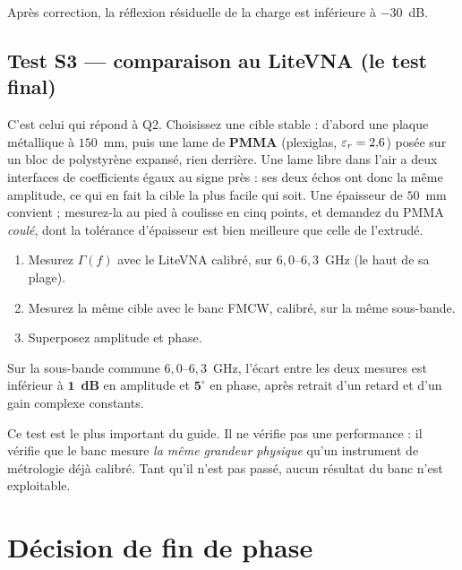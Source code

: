 \begin{critere}
Après correction, la réflexion résiduelle de la charge est inférieure à
$-30$~dB.
\end{critere}

\subsection{Test S3 --- comparaison au LiteVNA (le test final)}

C'est celui qui répond à Q2. Choisissez une cible stable : d'abord une plaque
métallique à $150$~mm, puis une lame de \textbf{PMMA} (plexiglas,
$\varepsilon_r = 2{,}6$) posée sur un bloc de polystyrène expansé, rien derrière. Une
lame libre dans l'air a deux interfaces de coefficients égaux au signe près :
ses deux échos ont donc la même amplitude, ce qui en fait la cible la plus
facile qui soit. Une épaisseur de $50$~mm convient ; mesurez-la au pied à
coulisse en cinq points, et demandez du PMMA \emph{coulé}, dont la tolérance
d'épaisseur est bien meilleure que celle de l'extrudé.

\begin{enumerate}[nosep]
\item Mesurez $\Gamma(f)$ avec le LiteVNA calibré, sur $6{,}0$--$6{,}3$~GHz
      (le haut de sa plage).
\item Mesurez la même cible avec le banc FMCW, calibré, sur la même
      sous-bande.
\item Superposez amplitude et phase.
\end{enumerate}

\begin{critere}
Sur la sous-bande commune $6{,}0$--$6{,}3$~GHz, l'écart entre les deux mesures
est inférieur à $\mathbf{1}$~\textbf{dB} en amplitude et $\mathbf{5^\circ}$ en
phase, après retrait d'un retard et d'un gain complexe constants.
\end{critere}

\begin{attention}
Ce test est le plus important du guide. Il ne vérifie pas une performance : il
vérifie que le banc mesure \emph{la même grandeur physique} qu'un instrument de
métrologie déjà calibré. Tant qu'il n'est pas passé, aucun résultat du banc
n'est exploitable.
\end{attention}

\section{Décision de fin de phase}

